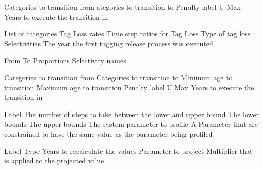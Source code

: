 \par\textbf{}\par
{} {Categories to transition from}
 {ategories to transition to}
 {Penalty label}
 {U Max}
 {Years to execute the transition in}
 {}
 {}
 {}
 {}
\par\textbf{}\par
{} {List of categories}
 {Tag Loss rates}
 {Time step ratios for Tag Loss}
 {Type of tag loss}
 {Selectivities}
 {The year the first tagging release process was executed}
\par\textbf{}\par
{} {From}
 {To}
 {Proportions}
 {Selectivity names}
\par\textbf{}\par
{} {Categories to transition from}
 {Categories to transition to}
 {Minimum age to transition}
 {Maximum age to transition}
 {Penalty label}
 {U Max}
 {Years to execute the transition in}
\par\par
{} {Label}
 {The number of steps to take between the lower and upper bound}
 {The lower bounds}
 {The upper bounds}
 {The system parameter to profile}
 {A Parameter that are constrained to have the same value as the parameter being profiled}
\par\par
{} {Label}
 {Type}
 {Years to recalculate the values}
 {Parameter to project}
 {Multiplier that is applied to the projected value}
\par\par
